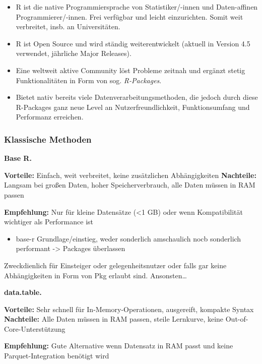 \documentclass[
  german,
  10pt,
  twoside]{article}
\providecommand{\tightlist}{%
  \setlength{\itemsep}{0pt}\setlength{\parskip}{0pt}}
\begin{document}
\begin{itemize}
\tightlist
\item
  R ist die native Programmiersprache von Statistiker/-innen und
  Daten-affinen Programmierer/-innen. Frei verfügbar und leicht
  einzurichten. Somit weit verbreitet, insb. an Universitäten.
\item
  R ist Open Source und wird ständig weiterentwickelt (aktuell in
  Version 4.5 verwendet, jährliche Major Releases).
\item
  Eine weltweit aktive Community löst Probleme zeitnah und ergänzt
  stetig Funktionalitäten in Form von sog. \emph{R-Packages}.
\item
  Bietet nativ bereits viele Datenverarbeitungsmethoden, die jedoch
  durch diese R-Packages ganz neue Level an Nutzerfreundlichkeit,
  Funktionsumfang und Performanz erreichen.
\end{itemize}

\subsubsection{Klassische Methoden}\label{klassische-methoden}

\textbf{Base R.}

\textbf{Vorteile:} Einfach, weit verbreitet, keine zusätzlichen
Abhängigkeiten \textbf{Nachteile:} Langsam bei großen Daten, hoher
Speicherverbrauch, alle Daten müssen in RAM passen

\textbf{Empfehlung:} Nur für kleine Datensätze (\textless1 GB) oder wenn
Kompatibilität wichtiger als Performance ist

\begin{itemize}
\tightlist
\item
  base-r Grundlage/einstieg, weder sonderlich amschaulich nocb
  sonderlich performant -\textgreater{} Packages überlassen
\end{itemize}

Zweckdienlich für Einsteiger oder gelegenheitsnutzer oder falls gar
keine Abhängigkeiten in Form von Pkg erlaubt sind. Ansonsten\ldots{}

\textbf{data.table.}

\textbf{Vorteile:} Sehr schnell für In-Memory-Operationen, ausgereift,
kompakte Syntax \textbf{Nachteile:} Alle Daten müssen in RAM passen,
steile Lernkurve, keine Out-of-Core-Unterstützung

\textbf{Empfehlung:} Gute Alternative wenn Datensatz in RAM passt und
keine Parquet-Integration benötigt wird
\end{document}

